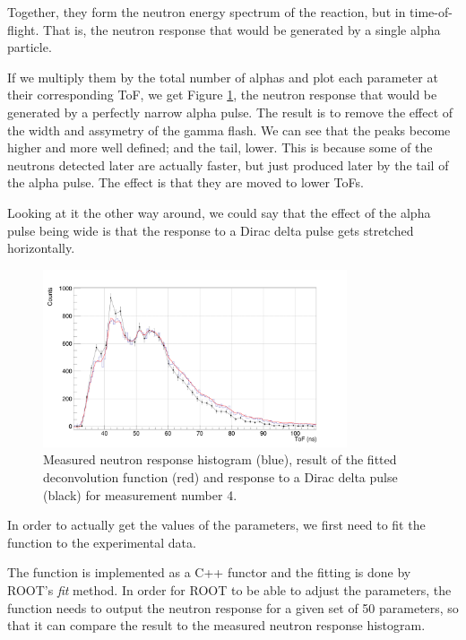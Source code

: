 \documentclass[a4paper,12pt]{report}
\begin{document}
Together, they form the neutron energy spectrum of the reaction, but in time-of-flight.
That is, the neutron response that would be generated by a single alpha particle.

If we multiply them by the total number of alphas and plot each parameter at their corresponding ToF, we get Figure \ref{pulsed_deconvolution_delta}, the neutron response that would be generated by a perfectly narrow alpha pulse.
The result is to remove the effect of the width and assymetry of the gamma flash.
We can see that the peaks become higher and more well defined; and the tail, lower.
This is because some of the neutrons detected later are actually faster, but just produced later by the tail of the alpha pulse.
The effect is that they are moved to lower ToFs.

Looking at it the other way around, we could say that the effect of the alpha pulse being wide is that the response to a Dirac delta pulse gets stretched horizontally.
\\

\begin{figure}[H]
	\centering
	\includegraphics[width=0.80\textwidth]{pulsed_deconvolution_delta.png}
	\caption{Measured neutron response histogram (blue), result of the fitted deconvolution function (red) and response to a Dirac delta pulse (black) for measurement number 4.}
	\label{pulsed_deconvolution_delta}
\end{figure}

In order to actually get the values of the parameters, we first need to fit the function to the experimental data.

The function is implemented as a C++ functor and the fitting is done by ROOT's \textit{fit} method.
In order for ROOT to be able to adjust the parameters, the function needs to output the neutron response for a given set of 50 parameters, so that it can compare the result to the measured neutron response histogram.
\end{document}
